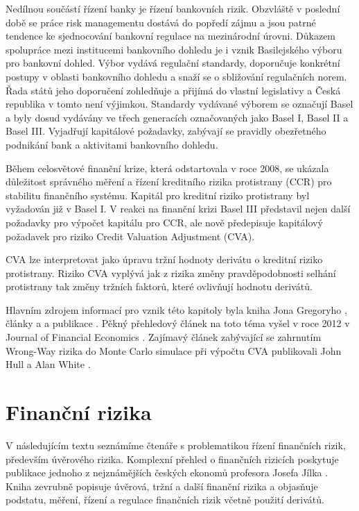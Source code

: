 \documentclass[a4paper,12pt]{report}
\theoremstyle{definition} \newtheorem{definice}[veta]{Definice}
\theoremstyle{remark}
\begin{document}
Nedílnou součástí řízení banky je řízení bankovních rizik.
Obzvláště v poslední době se práce risk managementu dostává do popředí zájmu
a jsou patrné tendence ke sjednocování bankovní regulace na mezinárodní úrovni.
Důkazem spolupráce mezi institucemi bankovního dohledu je i vznik Basilejského výboru pro bankovní dohled.
Výbor vydává regulační standardy, doporučuje konkrétní postupy v oblasti bankovního dohledu a snaží se o sbližování regulačních norem. 
Řada států jeho doporučení zohledňuje a přijímá do vlastní legislativy a Česká republika v tomto není výjimkou.
Standardy vydávané výborem se označují Basel a byly dosud vydávány ve třech generacích označovaných jako Basel I, Basel II a Basel III. 
Vyjadřují kapitálové požadavky, zabývají se pravidly obezřetného podnikání bank a aktivitami bankovního dohledu.

Během celosvětové finanční krize, která odstartovala v roce 2008, se ukázala důležitost správného měření a řízení kreditního rizika protistrany (CCR) pro stabilitu finančního systému.
Kapitál pro kreditní riziko protistrany byl vyžadován již v Basel I.  
V reakci na finanční krizi Basel III představil nejen další požadavky pro výpočet kapitálu pro CCR, ale nově
předepisuje kapitálový požadavek pro riziko Credit Valuation Adjustment (CVA). 

CVA lze interpretovat jako úpravu tržní hodnoty derivátu o kreditní riziko protistrany.
Riziko CVA vyplývá jak z rizika změny pravděpodobnosti selhání protistrany tak změny tržních faktorů, které ovlivňují hodnotu derivátů.

Hlavním zdrojem informací pro vznik této kapitoly byla kniha Jona Gregoryho \cite{gregory2010},
články \cite{zhu2007} a \cite{pykhtin2010} a publikace \cite{brigo2014}.
Pěkný přehledový článek na toto téma vyšel v roce 2012 v Journal of Financial Economics \cite{arora2012}.
Zajímavý článek zabývající se zahrnutím Wrong-Way rizika do Monte Carlo simulace při výpočtu CVA publikovali John Hull a Alan White \cite{hull2012cva}.



\section{Finanční rizika}
V následujícím textu seznámíme čtenáře s problematikou řízení finančních rizik, především úvěrového rizika.
Komplexní přehled o finančních rizicích poskytuje publikace  jednoho z nejznámějších českých ekonomů profesora Josefa Jílka \cite{jilek2000}.
Kniha zevrubně popisuje úvěrová, tržní a další finanční rizika a objasňuje podstatu, měření, řízení a regulace finančních rizik včetně použití derivátů.
\end{document}
